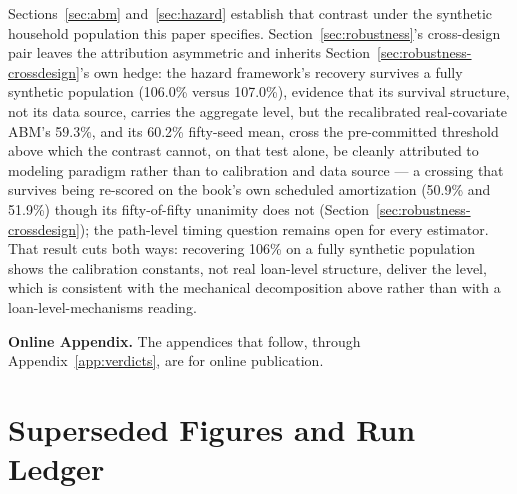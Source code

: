 \documentclass[12pt]{article}
\begin{document}
Sections~\ref{sec:abm} and~\ref{sec:hazard} establish that contrast under the synthetic household population this paper specifies. Section~\ref{sec:robustness}'s cross-design pair leaves the attribution asymmetric and inherits Section~\ref{sec:robustness-crossdesign}'s own hedge: the hazard framework's recovery survives a fully synthetic population (106.0\% versus 107.0\%), evidence that its survival structure, not its data source, carries the aggregate level, but the recalibrated real-covariate ABM's 59.3\%, and its 60.2\% fifty-seed mean, cross the pre-committed threshold above which the contrast cannot, on that test alone, be cleanly attributed to modeling paradigm rather than to calibration and data source --- a crossing that survives being re-scored on the book's own scheduled amortization (50.9\% and 51.9\%) though its fifty-of-fifty unanimity does not (Section~\ref{sec:robustness-crossdesign}); the path-level timing question remains open for every estimator. That result cuts both ways: recovering 106\% on a fully synthetic population shows the calibration constants, not real loan-level structure, deliver the level, which is consistent with the mechanical decomposition above rather than with a loan-level-mechanisms reading.

\newpage



\clearpage
\appendix

\noindent\textbf{Online Appendix.} The appendices that follow, through Appendix~\ref{app:verdicts}, are for online publication.

\section{Superseded Figures and Run Ledger}\label{app:ledger}
\end{document}
